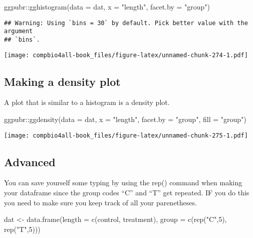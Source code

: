 \documentclass[
]{book}
\newenvironment{Shaded}{\begin{snugshade}}{\end{snugshade}}
\newcommand{\AttributeTok}[1]{\textcolor[rgb]{0.77,0.63,0.00}{#1}}
\newcommand{\DecValTok}[1]{\textcolor[rgb]{0.00,0.00,0.81}{#1}}
\newcommand{\FunctionTok}[1]{\textcolor[rgb]{0.00,0.00,0.00}{#1}}
\newcommand{\NormalTok}[1]{#1}
\newcommand{\OtherTok}[1]{\textcolor[rgb]{0.56,0.35,0.01}{#1}}
\newcommand{\SpecialCharTok}[1]{\textcolor[rgb]{0.00,0.00,0.00}{#1}}
\newcommand{\StringTok}[1]{\textcolor[rgb]{0.31,0.60,0.02}{#1}}
\begin{document}
\begin{Shaded}
\begin{Highlighting}[]
\NormalTok{ggpubr}\SpecialCharTok{::}\FunctionTok{gghistogram}\NormalTok{(}\AttributeTok{data =}\NormalTok{ dat,}
          \AttributeTok{x =} \StringTok{"length"}\NormalTok{,}
          \AttributeTok{facet.by =} \StringTok{"group"}\NormalTok{)}
\end{Highlighting}
\end{Shaded}

\begin{verbatim}
## Warning: Using `bins = 30` by default. Pick better value with the argument
## `bins`.
\end{verbatim}

\texttt{[image: compbio4all-book\_files/figure-latex/unnamed-chunk-274-1.pdf]}

\hypertarget{making-a-density-plot}{%
\subsection{Making a density plot}\label{making-a-density-plot}}

A plot that is similar to a histogram is a density plot.

\begin{Shaded}
\begin{Highlighting}[]
\NormalTok{ggpubr}\SpecialCharTok{::}\FunctionTok{ggdensity}\NormalTok{(}\AttributeTok{data =}\NormalTok{ dat,}
          \AttributeTok{x =} \StringTok{"length"}\NormalTok{,}
          \AttributeTok{facet.by =} \StringTok{"group"}\NormalTok{,}
          \AttributeTok{fill =} \StringTok{"group"}\NormalTok{)}
\end{Highlighting}
\end{Shaded}

\texttt{[image: compbio4all-book\_files/figure-latex/unnamed-chunk-275-1.pdf]}

\hypertarget{advanced-1}{%
\subsection{Advanced}\label{advanced-1}}

You can save yourself some typing by using the rep() command when making your dataframe since the group codes ``C'' and ``T'' get repeated. IF you do this you need to make sure you keep track of all your parenetheses.

\begin{Shaded}
\begin{Highlighting}[]
\NormalTok{dat }\OtherTok{\textless{}{-}} \FunctionTok{data.frame}\NormalTok{(}\AttributeTok{length =} \FunctionTok{c}\NormalTok{(control, }
\NormalTok{                             treatment),}
                  \AttributeTok{group =} \FunctionTok{c}\NormalTok{(}\FunctionTok{rep}\NormalTok{(}\StringTok{"C"}\NormalTok{,}\DecValTok{5}\NormalTok{),}
                            \FunctionTok{rep}\NormalTok{(}\StringTok{"T"}\NormalTok{,}\DecValTok{5}\NormalTok{)))}
\end{Highlighting}
\end{Shaded}
\end{document}
